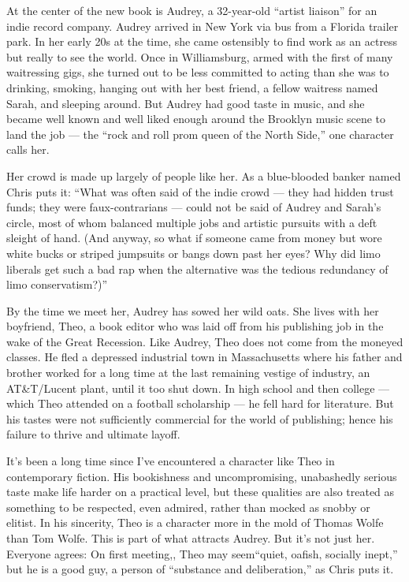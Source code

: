 At the center of the new book is Audrey, a 32-year-old ``artist
liaison'' for an indie record company. Audrey arrived in New York via
bus from a Florida trailer park. In her early 20s at the time, she came
ostensibly to find work as an actress but really to see the world. Once
in Williamsburg, armed with the first of many waitressing gigs, she
turned out to be less committed to acting than she was to drinking,
smoking, hanging out with her best friend, a fellow waitress named
Sarah, and sleeping around. But Audrey had good taste in music, and she
became well known and well liked enough around the Brooklyn music scene
to land the job --- the ``rock and roll prom queen of the North Side,''
one character calls her.

Her crowd is made up largely of people like her. As a blue-blooded
banker named Chris puts it: ``What was often said of the indie crowd ---
they had hidden trust funds; they were faux-contrarians --- could not be
said of Audrey and Sarah's circle, most of whom balanced multiple jobs
and artistic pursuits with a deft sleight of hand. (And anyway, so what
if someone came from money but wore white bucks or striped jumpsuits or
bangs down past her eyes? Why did limo liberals get such a bad rap when
the alternative was the tedious redundancy of limo conservatism?)''

By the time we meet her, Audrey has sowed her wild oats. She lives with
her boyfriend, Theo, a book editor who was laid off from his publishing
job in the wake of the Great Recession. Like Audrey, Theo does not come
from the moneyed classes. He fled a depressed industrial town in
Massachusetts where his father and brother worked for a long time at the
last remaining vestige of industry, an AT\&T/Lucent plant, until it too
shut down. In high school and then college --- which Theo attended on a
football scholarship --- he fell hard for literature. But his tastes
were not sufficiently commercial for the world of publishing; hence his
failure to thrive and ultimate layoff.

It's been a long time since I've encountered a character like Theo in
contemporary fiction. His bookishness and uncompromising, unabashedly
serious taste make life harder on a practical level, but these qualities
are also treated as something to be respected, even admired, rather than
mocked as snobby or elitist. In his sincerity, Theo is a character more
in the mold of Thomas Wolfe than Tom Wolfe. This is part of what
attracts Audrey. But it's not just her. Everyone agrees: On first
meeting,, Theo may seem``quiet, oafish, socially inept,'' but he is a
good guy, a person of ``substance and deliberation,'' as Chris puts it.

